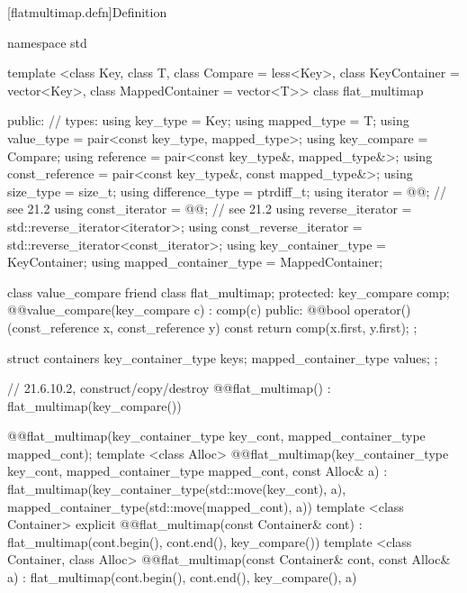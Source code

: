 \setcounter{subsection}{10}
\setcounter{subsubsection}{0}
[flatmultimap.defn]{Definition}

\begin{codeblock}
namespace std {
  template <class Key, class T, class Compare = less<Key>,
            class KeyContainer = vector<Key>,
            class MappedContainer = vector<T>>
  class flat_multimap {
  public:
    // types:
    using key_type                  = Key;
    using mapped_type               = T;
    using value_type                = pair<const key_type, mapped_type>;
    using key_compare               = Compare;
    using reference                 = pair<const key_type&, mapped_type&>;
    using const_reference           = pair<const key_type&, const mapped_type&>;
    using size_type                 = size_t;
    using difference_type           = ptrdiff_t;
    using iterator                  = @@; // see 21.2
    using const_iterator            = @@; // see 21.2
    using reverse_iterator          = std::reverse_iterator<iterator>;
    using const_reverse_iterator    = std::reverse_iterator<const_iterator>;
    using key_container_type        = KeyContainer;
    using mapped_container_type     = MappedContainer;

    class value_compare {
      friend class flat_multimap;
    protected:
      key_compare comp;
      @@value_compare(key_compare c) : comp(c) { }
    public:
      @@bool operator()(const_reference x, const_reference y) const {
        return comp(x.first, y.first);
      }
    };

    struct containers
    {
      key_container_type keys;
      mapped_container_type values;
    };

    // 21.6.10.2, construct/copy/destroy
    @@flat_multimap() : flat_multimap(key_compare()) { }

    @@flat_multimap(key_container_type key_cont, mapped_container_type mapped_cont);
    template <class Alloc>
    @@flat_multimap(key_container_type key_cont, mapped_container_type mapped_cont,
                            const Alloc& a)
        : flat_multimap(key_container_type(std::move(key_cont), a),
                        mapped_container_type(std::move(mapped_cont), a))
      { }
    template <class Container>
      explicit @@flat_multimap(const Container& cont)
        : flat_multimap(cont.begin(), cont.end(), key_compare()) { }
    template <class Container, class Alloc>
      @@flat_multimap(const Container& cont, const Alloc& a)
        : flat_multimap(cont.begin(), cont.end(), key_compare(), a) { }

}}
\end{codeblock}
